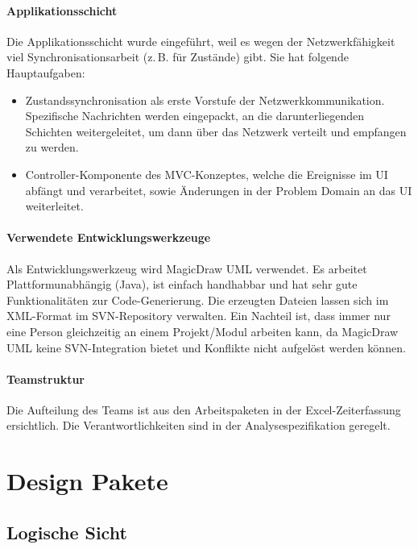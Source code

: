 \documentclass[12pt,halfparskip]{scrartcl}
\begin{document}
\paragraph{Applikationsschicht}\label{ssub:applikationsschicht} %
Die Applikationsschicht wurde eingeführt, weil es wegen der Netzwerkfähigkeit viel Synchronisationsarbeit (z.\,B. für Zustände) gibt. Sie hat folgende Hauptaufgaben:
	\begin{itemize}
		\item Zustandssynchronisation als erste Vorstufe der Netzwerkkommunikation. Spezifische Nachrichten werden eingepackt, an die darunterliegenden Schichten weitergeleitet, um dann über das Netzwerk verteilt und empfangen zu werden.
		\item Controller-Komponente des MVC-Konzeptes, welche die Ereignisse im UI abfängt und verarbeitet, sowie Änderungen in der Problem Domain an das UI weiterleitet.
	\end{itemize}
\paragraph{Verwendete Entwicklungswerkzeuge}\label{ssub:verwendete_entwicklungswerkzeuge} %
Als Entwicklungswerkzeug wird MagicDraw UML verwendet. Es arbeitet Plattformunabhängig (Java), ist einfach handhabbar und hat sehr gute Funktionalitäten zur Code-Generierung. Die erzeugten Dateien lassen sich im XML-Format im SVN-Repository verwalten. Ein Nachteil ist, dass immer nur eine Person gleichzeitig an einem Projekt/Modul arbeiten kann, da MagicDraw UML keine SVN-Integration bietet und Konflikte nicht aufgelöst werden können.
\paragraph{Teamstruktur}\label{ssub:teamstruktur} %
Die Aufteilung des Teams ist aus den Arbeitspaketen in der Excel-Zeiterfassung ersichtlich. Die Verantwortlichkeiten sind in der Analysespezifikation geregelt.

\clearpage
\section{Design Pakete} %
\label{design_pakete}

\subsection{Logische Sicht} %
\label{sub:logische_sicht}
\end{document}
